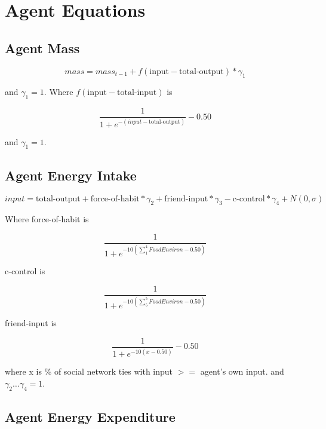 \documentclass[12pt]{article}
\begin{document}
\section{Agent Equations}

\subsection{Agent Mass}

\begin{equation}
mass = mass_{t-1} + f(\text{input} - \text{total-output}) * \gamma_1
\end{equation}

and $\gamma_1 = 1$. Where $f(\text{input} - \text{total-input})$ is

\begin{equation}
\frac{1}{1 + e^{-(input - \text{total-output})}} - 0.50
\end{equation}

and $\gamma_1 = 1$.


\subsection{Agent Energy Intake}

\begin{equation}
input = \text{total-output} + \text{force-of-habit} * \gamma_2 +
\text{friend-input} * \gamma_3 - \text{c-control}* \gamma_4 + N(0, \sigma)
\end{equation}

Where force-of-habit is

\begin{equation}
\frac{1}{1 + e^{-10(\sum_{1}^{4}FoodEnviron - 0.50)}}
\end{equation}

c-control is

\begin{equation}
\frac{1}{1 + e^{-10(\sum_{5}^{5}FoodEnviron - 0.50)}}
\end{equation}

friend-input is

\begin{equation}
\frac{1}{1 + e^{-10(x - 0.50)}} - 0.50
\end{equation}

where x is \% of social network ties with input $>=$ agent's own input. and $ \gamma_2 \ldots \gamma_4 = 1$.

\subsection{Agent Energy Expenditure}
\end{document}
